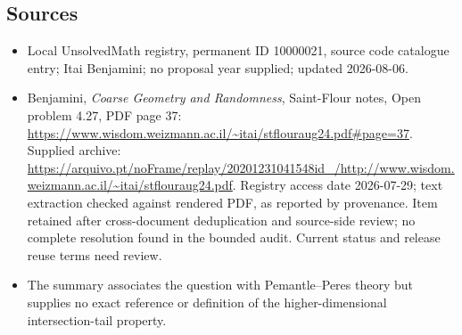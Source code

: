 \documentclass[11pt]{article}
\begin{document}
\subsection{Sources}
\begin{itemize}
\item Local UnsolvedMath registry, permanent ID 10000021, source code catalogue entry; Itai Benjamini; no proposal year supplied; updated 2026-08-06.
\item Benjamini, \emph{Coarse Geometry and Randomness}, Saint-Flour notes, Open problem 4.27, PDF page 37: \url{https://www.wisdom.weizmann.ac.il/~itai/stflouraug24.pdf#page=37}. Supplied archive: \url{https://arquivo.pt/noFrame/replay/20201231041548id_/http://www.wisdom.weizmann.ac.il/~itai/stflouraug24.pdf}. Registry access date 2026-07-29; text extraction checked against rendered PDF, as reported by provenance. Item retained after cross-document deduplication and source-side review; no complete resolution found in the bounded audit. Current status and release reuse terms need review.
\item The summary associates the question with Pemantle--Peres theory but supplies no exact reference or definition of the higher-dimensional intersection-tail property.
\end{itemize}
\end{document}
